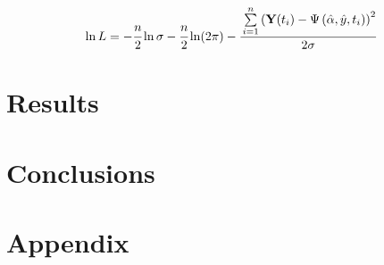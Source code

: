 \documentclass[a4paper,fleqn]{cas-dc}
\begin{document}
\begin{equation} 
	\ln L=-\cfrac{n}{2}\ln\sigma-\cfrac{n}{2}\ln(2\pi)-\cfrac{\sum\limits_{i=1}^n \left( \textbf{Y}(t_i) - \Psi\left( \hat{\alpha}, \hat{y}, t_i \right) \right)^2}{2\sigma}
\end{equation}

\section{Results} \label{CH: Results}

\section{Conclusions}

\clearpage
%



\clearpage \appendix \label{appendix}
\section{Appendix} 
\end{document}
